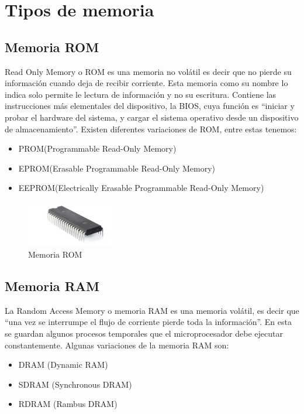 \documentclass{article}
\begin{document}
\section{Tipos de memoria}

\subsection{Memoria ROM} 
Read Only Memory o ROM es una memoria no volátil es decir que no pierde su información cuando deja de recibir corriente. Esta memoria como su nombre lo indica solo permite le lectura de información y no su escritura. Contiene las instrucciones más elementales del dispositivo, la BIOS, cuya función es ``iniciar y probar el hardware del sistema, y cargar el sistema operativo desde un dispositivo de almacenamiento''\cite{romram}. Existen diferentes variaciones de ROM, entre estas tenemos:

\begin{itemize}
    \item{PROM(Programmable Read-Only Memory)}
    \item{EPROM(Erasable Programmable Read-Only Memory)}
    \item{EEPROM(Electrically Erasable Programmable Read-Only Memory)}
\end{itemize}

\begin{figure}[h]
\includegraphics[width=4cm]{rom.jpg}
\centering
\caption{Memoria ROM}
\end{figure}

\subsection{Memoria RAM}
La Random Access Memory o memoria RAM es una memoria volátil, es decir que ``una vez se interrumpe el flujo de corriente pierde toda la información''\cite{romram}. En esta se guardan algunos procesos temporales que el microprocesador debe ejecutar constantemente. Algunas variaciones de la memoria RAM son:
\begin{itemize}
    \item{DRAM (Dynamic RAM)}
    \item{SDRAM (Synchronous DRAM)}
    \item{RDRAM (Rambus DRAM)}
\end{itemize}
\end{document}
